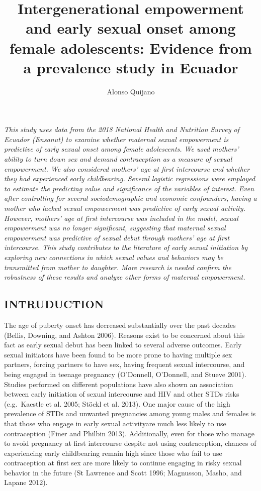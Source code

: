 \documentclass[
]{article}
\title{Intergenerational empowerment and early sexual onset among female
adolescents: Evidence from a prevalence study in Ecuador}
\author{Alonso Quijano}
\date{}
\begin{document}
\maketitle

\emph{This study uses data from the 2018 National Health and Nutrition
Survey of Ecuador (Ensanut) to examine whether maternal sexual
empowerment is predictive of early sexual onset among female
adolescents. We used mothers' ability to turn down sex and demand
contraception as a measure of sexual empowerment. We also considered
mothers' age at first intercourse and whether they had experienced early
childbearing. Several logistic regressions were employed to estimate the
predicting value and significance of the variables of interest. Even
after controlling for several sociodemographic and economic confounders,
having a mother who lacked sexual empowerment was predictive of early
sexual activity. However, mothers' age at first intercourse was included
in the model, sexual empowerment was no longer significant, suggesting
that maternal sexual empowerment was predictive of sexual debut through
mothers' age at first intercourse. This study contributes to the
literature of early sexual initiation by exploring new connections in
which sexual values and behaviors may be transmitted from mother to
daughter. More research is needed confirm the robustness of these
results and analyze other forms of maternal empowerment.}

\hypertarget{intruduction}{%
\subsection{INTRUDUCTION}\label{intruduction}}

The age of puberty onset has decreased substantially over the past
decades (Bellis, Downing, and Ashton 2006). Reasons exist to be
concerned about this fact as early sexual debut has been linked to
several adverse outcomes. Early sexual initiators have been found to be
more prone to having multiple sex partners, forcing partners to have
sex, having frequent sexual intercourse, and being engaged in teenage
pregnancy (O'Donnell, O'Donnell, and Stueve 2001). Studies performed on
different populations have also shown an association between early
initiation of sexual intercourse and HIV and other STDs risks
(e.g.~Kaestle et al. 2005; Stöckl et al. 2013). One major cause of the
high prevalence of STDs and unwanted pregnancies among young males and
females is that those who engage in early sexual activityare much less
likely to use contraception (Finer and Philbin 2013). Additionally, even
for those who manage to avoid pregnancy at first intercourse despite not
using contraception, chances of experiencing early childbearing remain
high since those who fail to use contraception at first sex are more
likely to continue engaging in risky sexual behavior in the future (St
Lawrence and Scott 1996; Magnusson, Masho, and Lapane 2012).
\end{document}
